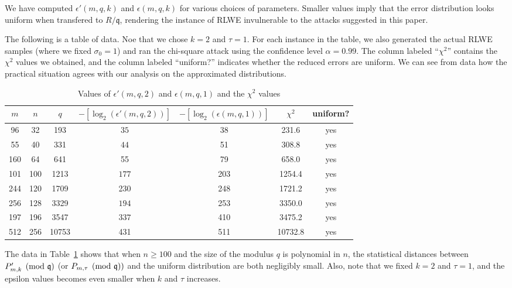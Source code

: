 \documentclass[envcountsame]{llncs}
\begin{document}
We have computed $\epsilon'(m,q,k)$ and $\epsilon(m,q,k)$ for various choices of parameters.  Smaller values imply that the error distribution looks uniform when transfered to $R/\mathfrak{q}$, rendering the instance of RLWE invulnerable to the attacks suggested in this paper.

The following is a table of data. Noe that we chose $k = 2$ and $\tau = 1$. For each instance in the table, we also  generated the actual RLWE samples (where we fixed $\sigma_0 = 1$) and ran the chi-square attack using the confidence level $\alpha = 0.99$. The column labeled ``$\chi^2$'' contains the $\chi^2$ values we obtained, and the column labeled ``uniform?'' indicates whether the reduced errors are uniform. We can see from data how the practical situation agrees with our analysis on the approximated distributions.


\begin{table}[H]
\caption{Values of $\epsilon'(m,q,2)$ and $\epsilon(m,q,1)$ and the $\chi^2$ values}
\label{tab: deg1}
\begin{center}
\begin{tabular}{c|c|c|c|c|c|c}
$m$ & $n$ & $q$ & $-[\log_2(\epsilon'(m,q, 2))]$ & $-[\log_2(\epsilon(m,q, 1))]$ & $\chi^2$ & uniform? \\
\hline
96 & 32 & 193 & $35$ & 38 & 231.6 & yes \\
55 & 40 & 331  & $44$ & 51 & 308.8 & yes \\
160 & 64 & 641 & 55 & 79& 658.0 & yes \\
101 & 100 & 1213 & $177$ & 203 & 1254.4 & yes \\
244 & 120 & 1709 & 230 & 248 & 1721.2 & yes \\
256 & 128 & 3329 & $194$ & 253 & 3350.0 & yes \\
197 & 196 & 3547 & $337$ & 410 & 3475.2 & yes \\
512 & 256 &10753 & 431 & 511 & 10732.8 & yes\\
\end{tabular}
\end{center}
\end{table}

The data in Table~\ref{tab: deg1} shows that when $n \geq 100$ and the size of the modulus $q$ is polynomial in $n$, the statistical distances between $P'_{m,k} \pmod{\mathfrak{q}}$ (or $P_{m,\tau} \pmod{\mathfrak{q}})$ and the uniform distribution are both negligibly small. Also, note that we fixed $k= 2$ and $\tau = 1$, and the epsilon values becomes even smaller when $k$ and $\tau$ increases.
\end{document}
